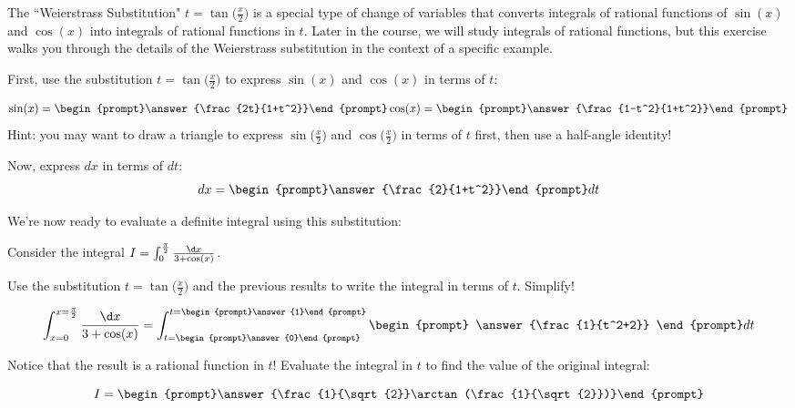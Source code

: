 \documentclass{ximera}
\author{Jim Talamo}
\begin{document}
The ``Weierstrass Substitution" $t= \tan\bigg(\frac{x}{2}\bigg)$ is a special type of change of variables that converts integrals of rational functions of $\sin(x)$ and $\cos(x)$ into integrals of rational functions in $t$.  Later in the course, we will study integrals of rational functions, but this exercise walks you through the details of the Weierstrass substitution in the context of a specific example.

\begin{exercise}

First, use the substitution $t= \tan\bigg(\frac{x}{2}\bigg)$ to express $\sin(x)$ and $\cos(x)$ in terms of $t$:

\begin{align*}
\sin(x) = \begin{prompt}\answer{\frac{2t}{1+t^2}}\end{prompt}
\cos(x) = \begin{prompt}\answer{\frac{1-t^2}{1+t^2}}\end{prompt}
\end{align*}
Hint: you may want to draw a triangle to express $\sin\bigg(\frac{x}{2}\bigg)$ and $\cos\bigg(\frac{x}{2}\bigg)$ in terms of $t$ first, then use a half-angle identity!

Now, express $dx$ in terms of $dt$:
\[dx = \begin{prompt}\answer{\frac{2}{1+t^2}}\end{prompt} dt \]
\end{exercise}

We're now ready to evaluate a definite integral using this substitution:
\begin{exercise}
Consider the integral $I = \int_0^{\frac{\pi}{2}} \frac{\d x}{3+\cos(x)}$.  

Use the substitution $t= \tan\bigg(\frac{x}{2}\bigg)$ and the previous results to write the integral in terms of $t$.  Simplify!

\[ \int_{x=0}^{x= \frac{\pi}{2}} \frac{\d x}{3+\cos(x)}  = \int_{t=\begin{prompt}\answer{0}\end{prompt}}^{t=\begin{prompt}\answer{1}\end{prompt}} \begin{prompt} \answer{\frac{1}{t^2+2}} \end{prompt} dt \]

Notice that the result is a rational function in $t$!  Evaluate the integral in $t$ to find the value of the original integral:

\[ I = \begin{prompt}\answer{\frac{1}{\sqrt{2}}\arctan(\frac{1}{\sqrt{2}})}\end{prompt} \]
\end{exercise}
\end{document}
